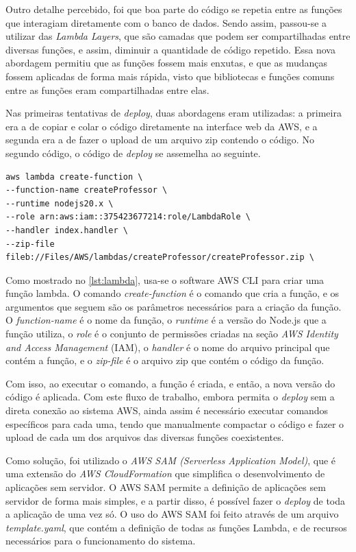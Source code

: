 Outro detalhe percebido, foi que boa parte do código se repetia entre as funções que interagiam diretamente com o banco de dados. Sendo assim, passou-se a utilizar das \textit{Lambda Layers}, que são camadas que podem ser compartilhadas entre diversas funções, e assim, diminuir a quantidade de código repetido. Essa nova abordagem permitiu que as funções fossem mais enxutas, e que as mudanças fossem aplicadas de forma mais rápida, visto que bibliotecas e funções comuns entre as funções eram compartilhadas entre elas.


Nas primeiras tentativas de \textit{deploy}, duas abordagens eram utilizadas: a primeira era a de copiar e colar o código diretamente na interface web da AWS, e a segunda era a de fazer o upload de um arquivo zip contendo o código. No segundo código, o código de \textit{deploy} se assemelha ao seguinte.

\begin{lstlisting}[caption={Código de \textit{deploy} de Lambda}, label={lst:lambda}]
aws lambda create-function \
--function-name createProfessor \
--runtime nodejs20.x \
--role arn:aws:iam::375423677214:role/LambdaRole \
--handler index.handler \
--zip-file fileb://Files/AWS/lambdas/createProfessor/createProfessor.zip \
\end{lstlisting}

Como mostrado no \autoref{lst:lambda}, usa-se o software AWS CLI para criar uma função lambda. O comando \textit{create-function} é o comando que cria a função, e os argumentos que seguem são os parâmetros necessários para a criação da função. O \textit{function-name} é o nome da função, o \textit{runtime} é a versão do Node.js que a função utiliza, o \textit{role} é o conjunto de permissões criadas na seção \textit{AWS Identity and Access Management} (IAM), o \textit{handler} é o nome do arquivo principal que contém a função, e o \textit{zip-file} é o arquivo zip que contém o código da função.

Com isso, ao executar o comando, a função é criada, e então, a nova versão do código é aplicada. Com este fluxo de trabalho, embora permita o \textit{deploy} sem a direta conexão ao sistema AWS, ainda assim é necessário executar comandos específicos para cada uma, tendo que manualmente compactar o código e fazer o upload de cada um dos arquivos das diversas funções coexistentes.


Como solução, foi utilizado o \textit{AWS SAM (Serverless Application Model)}, que é uma extensão do \textit{AWS CloudFormation} que simplifica o desenvolvimento de aplicações sem servidor. O AWS SAM permite a definição de aplicações sem servidor de forma mais simples, e a partir disso, é possível fazer o \textit{deploy} de toda a aplicação de uma vez só. O uso do AWS SAM foi feito através de um arquivo \textit{template.yaml}, que contém a definição de todas as funções Lambda, e de recursos necessários para o funcionamento do sistema.

